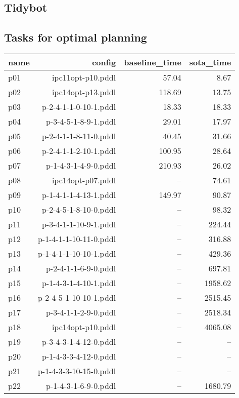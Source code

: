 \documentclass{article}
\begin{document}
                \newpage \subsection{Tidybot}
                    \subsection*{Tasks for optimal planning}
                    
                            \begin{center}
                            \scriptsize
                            \begin{tabular}{@{}l|r|r|r@{}}
                            name & config & baseline\_time & sota\_time\\\midrule
                              p01& ipc11opt-p10.pddl&57.04&8.67\\
  p02& ipc14opt-p13.pddl&118.69&13.75\\
  p03& p-2-4-1-1-0-10-1.pddl&18.33&18.33\\
  p04& p-3-4-5-1-8-9-1.pddl&29.01&17.97\\
  p05& p-2-4-1-1-8-11-0.pddl&40.45&31.66\\
  p06& p-2-4-1-1-2-10-1.pddl&100.95&28.64\\
  p07& p-1-4-3-1-4-9-0.pddl&210.93&26.02\\
  p08& ipc14opt-p07.pddl&--&74.61\\
  p09& p-1-4-1-1-4-13-1.pddl&149.97&90.87\\
  p10& p-2-4-5-1-8-10-0.pddl&--&98.32\\
  p11& p-3-4-1-1-10-9-1.pddl&--&224.44\\
  p12& p-1-4-1-1-10-11-0.pddl&--&316.88\\
  p13& p-1-4-1-1-10-10-1.pddl&--&429.36\\
  p14& p-2-4-1-1-6-9-0.pddl&--&697.81\\
  p15& p-1-4-3-1-4-10-1.pddl&--&1958.62\\
  p16& p-2-4-5-1-10-10-1.pddl&--&2515.45\\
  p17& p-3-4-1-1-2-9-0.pddl&--&2518.34\\
  p18& ipc14opt-p10.pddl&--&4065.08\\
  p19& p-3-4-3-1-4-12-0.pddl&--&--\\
  p20& p-1-4-3-3-4-12-0.pddl&--&--\\
  p21& p-1-4-3-3-10-15-0.pddl&--&--\\
  p22& p-1-4-3-1-6-9-0.pddl&--&1680.79\\

\end{tabular}
\end{center}
\end{document}
